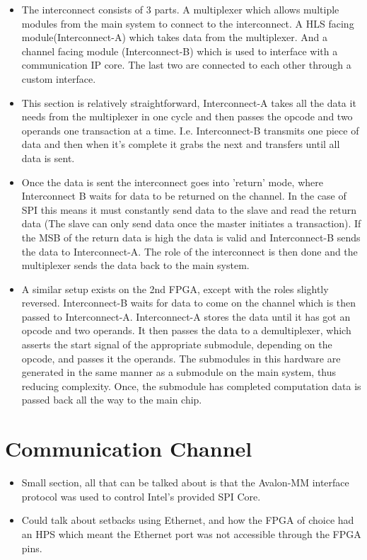 \begin{itemize}
    \item The interconnect consists of 3 parts. A multiplexer which allows multiple modules from the main system to connect to the interconnect. A HLS facing module(Interconnect-A) which takes data from the multiplexer. And a channel facing module (Interconnect-B) which is used to interface with a communication IP core. The last two are connected to each other through a custom interface.
    \item This section is relatively straightforward, Interconnect-A takes all the data it needs from the multiplexer in one cycle and then passes the opcode and two operands one transaction at a time. I.e. Interconnect-B transmits one piece of data and then when it's complete it grabs the next and transfers until all data is sent.
    \item Once the data is sent the interconnect goes into 'return' mode, where Interconnect B waits for data to be returned on the channel. In the case of SPI this means it must constantly send data to the slave and read the return data (The slave can only send data once the master initiates a transaction). If the MSB of the return data is high the data is valid and Interconnect-B sends the data to Interconnect-A. The role of the interconnect is then done and the multiplexer sends the data back to the main system.
    \item A similar setup exists on the 2nd FPGA, except with the roles slightly reversed. Interconnect-B waits for data to come on the channel which is then passed to Interconnect-A. Interconnect-A  stores the data until it has got an opcode and two operands. It then passes the data to a demultiplexer, which asserts the start signal of the appropriate submodule, depending on the opcode, and passes it the operands. The submodules in this hardware are generated in the same manner as a submodule on the main system, thus reducing complexity. Once, the submodule has completed computation data is passed back all the way to the main chip.
\end{itemize}

\section{Communication Channel}

\begin{itemize}
    \item Small section, all that can be talked about is that the Avalon-MM interface protocol was used to control Intel's provided SPI Core.
    \item Could talk about setbacks using Ethernet, and how the FPGA of choice had an HPS which meant the Ethernet port was not accessible through the FPGA pins.
\end{itemize}